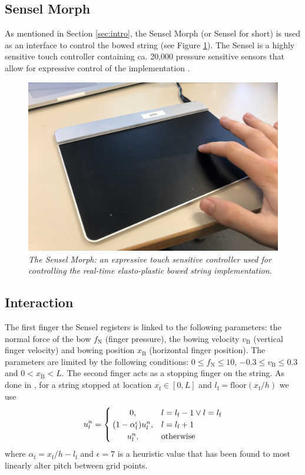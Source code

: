     \subsection{Sensel Morph}
    As mentioned in Section \ref{sec:intro}, the Sensel Morph (or Sensel for short) is used as an interface to control the bowed string (see Figure \ref{fig:sensel}). The Sensel is a highly sensitive touch controller containing ca. 20,000 pressure sensitive sensors that allow for expressive control of the implementation \cite{Sensel2019}.
    \begin{figure}[ht]
    \centerline{\includegraphics[width=\paperFigWidth\textwidth]{figures/IMG_0637.jpg}}
    \caption{\label{fig:sensel}{\it The Sensel Morph: an expressive touch sensitive controller used for controlling the real-time elasto-plastic bowed string implementation.}}
    \end{figure}
    
    \subsection{Interaction}
    The first finger the Sensel registers is linked to the following parameters: the normal force of the bow $f_\text{N}$ (finger pressure), the bowing velocity $v_\text{B}$ (vertical finger velocity) and bowing position $x_\text{B}$ (horizontal finger position). The parameters are limited by the following conditions: $0 \leq f_\text{N} \leq 10$, $-0.3 \leq v_\text{B} \leq 0.3$ and $0<x_\text{B}<L$. The second finger acts as a stopping finger on the string. As done in \cite{Willemsen2019}, for a string stopped at location $x_\text{f}\in[0,L]$ and $l_\text{f}=\text{floor}(x_\text{f}/h)$ we use
    \begin{equation}
    u_l^n = 
        \begin{cases}
            \hfil 0, & l = l_\text{f} - 1 \vee l = l_\text{f}\\
            \hfil (1-\alpha_\text{f}^\epsilon) u_l^n, & l = l_\text{f} + 1\\
            \hfil u_l^n, & \text{otherwise}
        \end{cases}
    \end{equation}
    where $\alpha_\text{f} = x_\text{f} / h - l_\text{f}$ and $\epsilon = 7$ is a heuristic value that has been found to most linearly alter pitch between grid points. 
    
